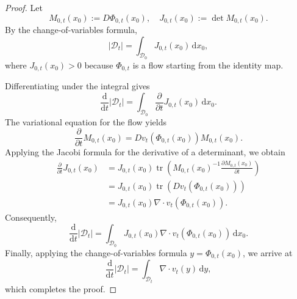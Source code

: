 \documentclass[12pt,a4paper,oneside]{book}
\begin{document}
\begin{proof}
Let
\begin{equation*}
    M_{0,t}(x_0):=D\Phi_{0,t}(x_0), \quad
    J_{0,t}(x_0):=\det M_{0,t}(x_0).
\end{equation*}
By the change-of-variables formula,
\begin{equation*}
    |\mathcal D_t| = \int_{\mathcal D_0}J_{0,t}(x_0)\,\mathrm dx_0,
\end{equation*}
where $J_{0,t}(x_0)>0$ because $\Phi_{0,t}$ is a flow starting from the identity map.

Differentiating under the integral gives
\begin{equation*}
    \frac{\mathrm d}{\mathrm dt}|\mathcal D_t| = \int_{\mathcal D_0}
    \frac{\partial}{\partial t}J_{0,t}(x_0)\,\mathrm dx_0.
\end{equation*}
The variational equation for the flow yields
\begin{equation*}
    \frac{\partial}{\partial t}M_{0,t}(x_0)
    = Dv_t(\Phi_{0,t}(x_0))M_{0,t}(x_0).
\end{equation*}
Applying the Jacobi formula for the derivative of a determinant,
we obtain
\begin{equation*}
    \begin{aligned}
        \frac{\partial}{\partial t}J_{0,t}(x_0) &= J_{0,t}(x_0) \operatorname{tr}
            \left(
                M_{0,t}(x_0)^{-1}\frac{\partial M_{0,t}(x_0)}{\partial t}
            \right)\\
        &=J_{0,t}(x_0) \operatorname{tr}
            \left(
                Dv_t(\Phi_{0,t}(x_0))
            \right)\\
        &=J_{0,t}(x_0) \nabla\cdot v_t(\Phi_{0,t}(x_0)).
    \end{aligned}
\end{equation*}
Consequently,
\begin{equation*}
    \frac{\mathrm d}{\mathrm dt}|\mathcal D_t|
    = \int_{\mathcal D_0} J_{0,t}(x_0)\nabla\cdot v_t(\Phi_{0,t}(x_0)) \,\mathrm dx_0.
\end{equation*}
Finally, applying the change-of-variables formula $y=\Phi_{0,t}(x_0)$, we arrive at
\begin{equation*}
    \frac{\mathrm d}{\mathrm dt}|\mathcal D_t| = \int_{\mathcal D_t}\nabla\cdot v_t(y)\,\mathrm dy,
\end{equation*}
which completes the proof.
\end{proof}
\end{document}
